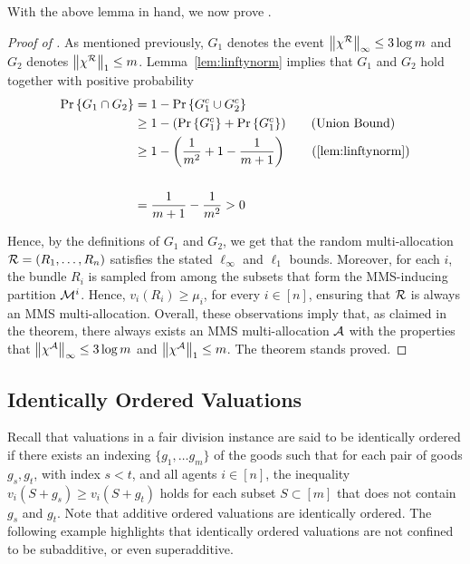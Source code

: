 With the above lemma in hand, we now prove .

\begin{proof}[Proof of ] As mentioned previously, $G_1$ denotes the event $\left\|\chi^{\mathcal{R}}\right\|_\infty \leq 3 \log m$ and $G_2$ denotes $\left\|\chi^{\mathcal{R}}\right\|_1 \leq m$. Lemma~\ref{lem:linftynorm} implies that $G_1$ and $G_2$ hold together with positive probability
\begin{align*}
\prob{G_1 \cap G_2} & = 1 - \prob{G_1^c \cup G_2^c} \\ 
& \geq 1 - (\prob{G_1^c} +\prob{G_1^c}) \tag{Union Bound} \\
& \geq 1-\left(\frac{1}{m^2} + 1 - \frac{1}{m+1}\right) \tag{\Cref{lem:linftynorm}} \\
\\ & =\frac{1}{m+1} - \frac{1}{m^2} > 0
\end{align*}

Hence, by the definitions of $G_1$ and $G_2$, we get that the random multi-allocation $\mathcal{R}=(R_1, \ldots, R_n)$ satisfies the stated $\ell_\infty$ and $\ell_1$ bounds. Moreover, for each $i$, the bundle $R_i$ is sampled from among the subsets that form the MMS-inducing partition $\mathcal{M}^i$. Hence, $v_i(R_i) \geq \mu_i$, for every $i \in [n]$, ensuring that $\mathcal{R}$ is always an MMS multi-allocation. Overall, these observations imply that, as claimed in the theorem, there always exists an MMS multi-allocation $\mathcal{A}$ with the properties that $\left\|\chi^{\mathcal{A}}\right\|_\infty \leq 3 \log  m$ and $\left\|\chi^{\mathcal{A}}\right\|_1\leq m$. The theorem stands proved. 
\end{proof}


\subsection{Identically Ordered Valuations}\label{subsec:additive-ordered}
Recall that valuations in a fair division instance are said to be identically ordered if there exists an indexing $\{g_1, \ldots g_m\}$ of the goods such that for each pair of goods $g_s, g_t$, with index $s < t$, and all agents $i \in [n]$, the inequality $v_i(S + {g_s }) \geq  v_i(S + {g_t })$ holds for each subset $S \subset [m]$ that does not contain $g_s$ and $g_t$. Note that additive ordered valuations are identically ordered. The following example highlights that identically ordered valuations are not confined to be subadditive, or even superadditive. 

